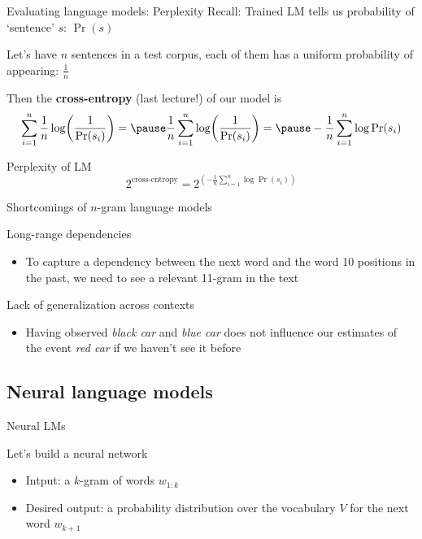 \documentclass[12pt,aspectratio=169,handout]{beamer}
\begin{document}
\begin{frame}{Evaluating language models: Perplexity}
Recall: Trained LM tells us probability of `sentence' $s$: $\Pr(s)$

\pause
Let's have $n$ sentences in a test corpus, each of them has a uniform probability of appearing: $\frac{1}{n}$

\pause
Then the \textbf{cross-entropy} (last lecture!) of our model is
$$
\sum_{i = 1}^{n} \frac{1}{n} \log (\frac{1}{\Pr(s_i)}) = \pause
\frac{1}{n} \sum_{i = 1}^{n} \log (\frac{1}{\Pr(s_i)}) = \pause
- \frac{1}{n} \sum_{i = 1}^{n} \log \Pr(s_i)
$$
\pause \begin{block}{Perplexity of LM}
$$
2^{\text{cross-entropy}} = 
2^{\left(- \frac{1}{n} \sum_{i = 1}^{n} \log \Pr(s_i)\right)}
$$
\end{block}

\end{frame}

\begin{frame}{Shortcomings of $n$-gram language models}

\pause
Long-range dependencies
\begin{itemize}
	\item To capture a dependency between the next word and the word 10 positions in the past, we need to see a relevant 11-gram in the text
\end{itemize}

\pause
Lack of generalization across contexts
\begin{itemize}
	\item Having observed \emph{black car} and \emph{blue car} does not influence our estimates of the event \emph{red car} if we haven't see it before
\end{itemize}


\end{frame}

\subsection{Neural language models}

\begin{frame}{Neural LMs}

Let's build a neural network
\begin{itemize}
	\item Intput: a $k$-gram of words $w_{1:k}$
	\item Desired output: a probability distribution over the vocabulary $V$ for the next word $w_{k+1}$
\end{itemize}

\end{frame}
\end{document}
